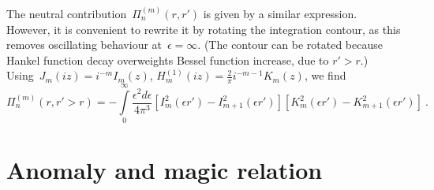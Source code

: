 \documentclass[preprint,aps,prb]{revtex4}
\begin{document}
The neutral contribution~$\Pi_n^{(m)}(r, r')$ is given by a similar 
expression. However, it is convenient to rewrite it by rotating
the integration contour, as this removes oscillating behaviour 
at~$\epsilon = \infty$. (The contour can be rotated because 
Hankel function decay overweights Bessel function increase, due to 
$r' > r$.)
Using~$J_m(iz) = i^{-m} I_m(z)$, 
$H^{(1)}_m(iz) = \frac{2}{\pi} i^{- m - 1} K_m(z)$, 
we find
\begin{equation}
\label{Pi-n}
\Pi_n^{(m)}(r, r' > r) 
= - \int\limits_{0}^{\infty}
    \frac{\epsilon^2 d\epsilon}{4\pi^3} 
    \left[I_m^2(\epsilon r') - I^2_{m + 1}(\epsilon r') \right]
    \left[K_m^2(\epsilon r') - K^2_{m + 1}(\epsilon r') \right]
\ .   
\end{equation}

\section{Anomaly and magic relation}
\end{document}
